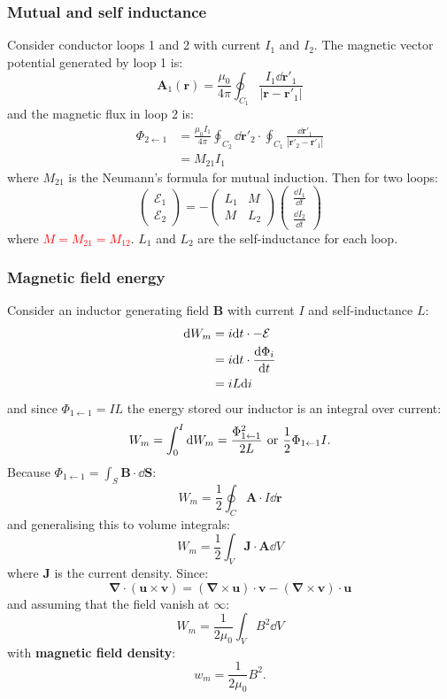 \documentclass{article}
\newcommand{\vc}[1]{\boldsymbol{#1}}
\begin{document}
\begin{multicols*}{3}
\subsubsection*{Mutual and self inductance}
Consider conductor loops 1 and 2 with
current $I_1$ and $I_2$.
The magnetic vector potential generated by loop 1 is:
$$\vc{A}_1(\vc{r})=\frac{\mu_0}{4\pi}\oint_{C_1}
\frac{I_1\dd\vc{r}'_1}{|\vc{r}-\vc{r}'_1|}$$
and the magnetic flux in loop 2 is:
\begin{align*}
    \Phi_{2\leftarrow1}
    &=\frac{\mu_0 I_1}{4\pi}\oint_{C_2}\dd\vc{r}'_2
    \cdot\oint_{C_1}\frac{\dd\vc{r}'_1}{|\vc{r}'_2-\vc{r}'_1|} \\
    &=M_{21}I_1
\end{align*}
where $M_{21}$ is the Neumann's formula for mutual induction.
Then for two loops:
$$\begin{pmatrix}\mathcal{E}_1 \\ \mathcal{E}_2\end{pmatrix}=
-\begin{pmatrix}L_1 & M \\ M & L_2\end{pmatrix}
\begin{pmatrix}\frac{\dd I_1}{\dd t}
\\[0.2em] \frac{\dd I_2}{\dd t}\end{pmatrix}$$
where \textcolor{red}{$M=M_{21}=M_{12}$}.
$L_1$ and $L_2$ are the self-inductance for each loop.

\subsubsection*{Magnetic field energy}
Consider an inductor generating field $\vc{B}$
with current $I$ and self-inductance $L$:
\begin{align*}
    \dd W_m
    &=i\dd t\cdot -\mathcal{E} \\
    &=i\dd t\cdot\dv{\Phi_i}{t} \\
    &=iL\dd i
\end{align*}
and since $\Phi_{1\leftarrow1}=IL$
the energy stored our inductor is an integral over current:
$$W_m=\int_{0}^{I}\dd W_m=\frac{\Phi_{1\leftarrow1}^2}{2L}
\hspace{0.05in}\text{or}\hspace{0.05in}
\frac{1}{2}\Phi_{1\leftarrow1} I.$$
Because
$\displaystyle\Phi_{1\leftarrow1}=\int_S\vc{B}\cdot\dd\vc{S}$:
$$W_m=\frac{1}{2}\oint_C\vc{A}\cdot I\dd\vc{r}$$
and generalising this to volume integrals:
$$W_m=\frac{1}{2}\int_V\vc{J}\cdot\vc{A}\dd V$$
where $\vc{J}$ is the current density. Since:
$$\vc{\nabla}\cdot(\vc{u}\times\vc{v})
=(\vc{\nabla}\times\vc{u})\cdot\vc{v}
-(\vc{\nabla}\times\vc{v})\cdot\vc{u}$$
and assuming that the field vanish at $\infty$:
$$W_m=\frac{1}{2\mu_0}\int_V B^2\dd V$$
with \textbf{magnetic field density}:
$$w_m=\frac{1}{2\mu_0}B^2.$$


\end{multicols*}
\end{document}
